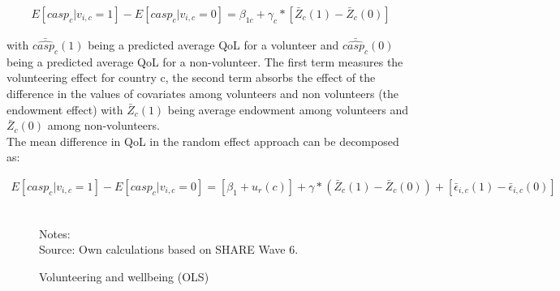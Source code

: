 \documentclass[10pt, letterpaper]{article}
\begin{document}
\begin{spacing}{1.4}
 \begin{eqnarray}
 \label{eq:casp_ols}
E[casp_{c}|v_{i,c}=1] - E[casp_{c}|v_{i,c}=0]= \beta_{1c}+ \gamma_{c}*[\bar{Z}_{c}(1)-\bar{Z}_{c}(0)]
 \end{eqnarray}

with $\bar{\hat{casp_{c}}}(1)$ being a predicted average QoL for a volunteer and $\bar{\hat{casp_{c}}}(0)$ being a predicted average QoL for a non-volunteer.  The first term measures the volunteering effect for country c, the second term absorbs the effect of the difference in the values of covariates among volunteers and non volunteers (the endowment effect) with $\bar{Z}_{c}(1)$ being average endowment among volunteers and $\bar{Z}_{c}(0)$ among non-volunteers. \\

The mean difference in QoL in the random effect approach can be decomposed as: 

 \begin{eqnarray}
 \label{eq:decomp_mlm}
E[casp_{c}|v_{i,c}=1]-E[casp_{c}|v_{i,c}=0]= [\beta_{1}+u_{r}(c)]+ \gamma*(\bar{Z}_{c}(1)-\bar{Z}_{c}(0))+ [\bar{\epsilon}_{i,c}(1)-\bar{\epsilon}_{i,c}(0)]
 \end{eqnarray}

\begin{figure}[H]
\centering
\caption{Volunteering and wellbeing (OLS)} 
\label{fig:casp_ols}
\begin{minipage}{1\linewidth}
\quad
{}~\\ 
{\footnotesize Notes: }~\\
{\footnotesize Source: Own calculations based on SHARE Wave 6.}
\end{minipage}
\end{figure} 


\end{spacing}
\end{document}
